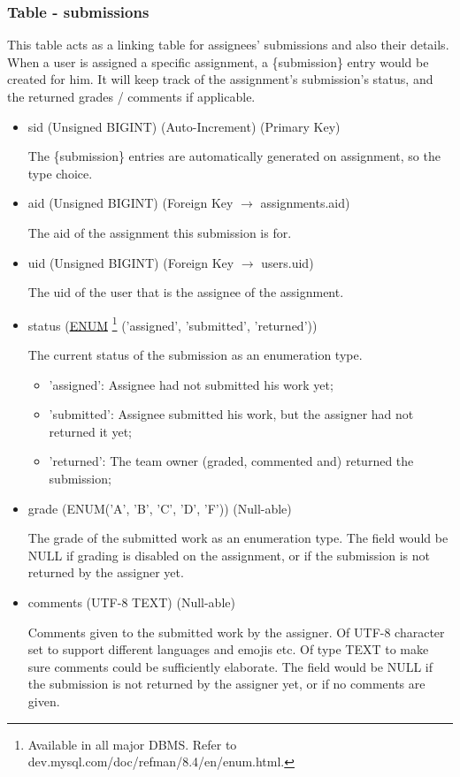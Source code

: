 \documentclass[12pt]{report}
\newcommand{\n}{\par}
\begin{document}
\subsubsection{Table - submissions} \label{data-layer.design.assignment-system.submissions}
This table acts as a linking table for assignees' submissions and also their details.
When a user is assigned a specific assignment, a \{submission\} entry would be created for him.
It will keep track of the assignment's submission's status,
and the returned grades / comments if applicable.
\begin{itemize}
	\item sid (Unsigned BIGINT) (Auto-Increment) (Primary Key)\n
	      The \{submission\} entries are automatically generated on assignment, so the type choice.
	\item aid (Unsigned BIGINT) (Foreign Key $\rightarrow$ assignments.aid)\n
	      The aid of the assignment this submission is for.
	\item uid (Unsigned BIGINT) (Foreign Key $\rightarrow$ users.uid)\n
	      The uid of the user that is the assignee of the assignment.
	\item status (\href{https://dev.mysql.com/doc/refman/8.4/en/enum.html}{ENUM}
	      \footnote{Available in all major DBMS. Refer to dev.mysql.com/doc/refman/8.4/en/enum.html.}
	      ('assigned', 'submitted', 'returned'))\n
	      The current status of the submission as an enumeration type.
	      \begin{itemize}
		      \item 'assigned': Assignee had not submitted his work yet;
		      \item 'submitted': Assignee submitted his work, but the assigner had not returned it yet;
		      \item 'returned': The team owner (graded, commented and) returned the submission;
	      \end{itemize}
	\item grade (ENUM('A', 'B', 'C', 'D', 'F')) (Null-able)\n
	      The grade of the submitted work as an enumeration type.
	      The field would be NULL if grading is disabled on the assignment,
	      or if the submission is not returned by the assigner yet.
	\item comments (UTF-8 TEXT) (Null-able)\n
	      Comments given to the submitted work by the assigner.
	      Of UTF-8 character set to support different languages and emojis etc.
	      Of type TEXT to make sure comments could be sufficiently elaborate.
	      The field would be NULL if the submission is not returned by the assigner yet,
	      or if no comments are given.
\end{itemize}
\end{document}
